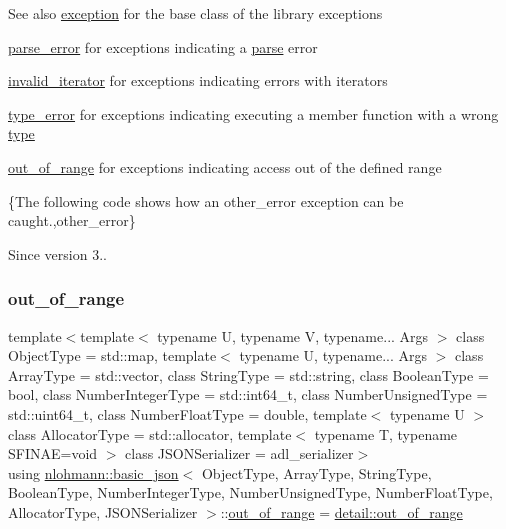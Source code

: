 \begin{DoxySeeAlso}{See also}
\mbox{\hyperlink{classnlohmann_1_1basic__json_a9a0aced019cb1d65bb49703406c84970}{exception}} for the base class of the library exceptions 

\mbox{\hyperlink{classnlohmann_1_1basic__json_af1efc2468e6022be6e35fc2944cabe4d}{parse\+\_\+error}} for exceptions indicating a \mbox{\hyperlink{classnlohmann_1_1basic__json_aa9676414f2e36383c4b181fe856aa3c0}{parse}} error 

\mbox{\hyperlink{classnlohmann_1_1basic__json_ac13d32f7cbd02d616e71d8dc30dadcbf}{invalid\+\_\+iterator}} for exceptions indicating errors with iterators 

\mbox{\hyperlink{classnlohmann_1_1basic__json_a4010e8e268fefd86da773c10318f2902}{type\+\_\+error}} for exceptions indicating executing a member function with a wrong \mbox{\hyperlink{classnlohmann_1_1basic__json_a2b2d781d7f2a4ee41bc0016e931cadf7}{type}} 

\mbox{\hyperlink{classnlohmann_1_1basic__json_a28f7c2f087274a0012eb7a2333ee1580}{out\+\_\+of\+\_\+range}} for exceptions indicating access out of the defined range
\end{DoxySeeAlso}
\{The following code shows how an {\ttfamily other\+\_\+error} exception can be caught.,other\+\_\+error\}

\begin{DoxySince}{Since}
version 3.. 
\end{DoxySince}
\mbox{\label{classnlohmann_1_1basic__json_a28f7c2f087274a0012eb7a2333ee1580}} 
\subsubsection{\texorpdfstring{out\+\_\+of\+\_\+range}{out\_of\_range}}
{\footnotesize\ttfamily template$<$template$<$ typename U, typename V, typename... Args $>$ class Object\+Type = std\+::map, template$<$ typename U, typename... Args $>$ class Array\+Type = std\+::vector, class String\+Type  = std\+::string, class Boolean\+Type  = bool, class Number\+Integer\+Type  = std\+::int64\+\_\+t, class Number\+Unsigned\+Type  = std\+::uint64\+\_\+t, class Number\+Float\+Type  = double, template$<$ typename U $>$ class Allocator\+Type = std\+::allocator, template$<$ typename T, typename S\+F\+I\+N\+A\+E=void $>$ class J\+S\+O\+N\+Serializer = adl\+\_\+serializer$>$ \\
using \mbox{\hyperlink{classnlohmann_1_1basic__json}{nlohmann\+::basic\+\_\+json}}$<$ Object\+Type, Array\+Type, String\+Type, Boolean\+Type, Number\+Integer\+Type, Number\+Unsigned\+Type, Number\+Float\+Type, Allocator\+Type, J\+S\+O\+N\+Serializer $>$\+::\mbox{\hyperlink{classnlohmann_1_1basic__json_a28f7c2f087274a0012eb7a2333ee1580}{out\+\_\+of\+\_\+range}} =  \mbox{\hyperlink{classnlohmann_1_1detail_1_1out__of__range}{detail\+::out\+\_\+of\+\_\+range}}}



